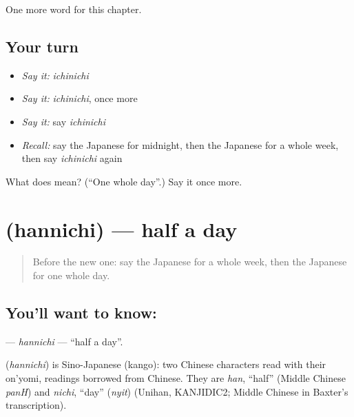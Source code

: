 \begin{grammarlens}[title={What you've built}]
One more word for this chapter.
\end{grammarlens}

\subsection*{Your turn}
\begin{itemize}
\raggedright
  \item \emph{Say it:} \emph{ichinichi}
  \item \emph{Say it:} \emph{ichinichi}, once more
  \item \emph{Say it:} say \emph{ichinichi}
  \item \emph{Recall:} say the Japanese for midnight, then the Japanese for a whole week, then say \emph{ichinichi} again
\end{itemize}

\begin{tcolorbox}[breakable,colback=teal!4,colframe=teal!35!black,title={Before you move on}]
What does  mean? (\textquotedblleft{}One whole day\textquotedblright{}.) Say it once more.
\end{tcolorbox}
\section[\texorpdfstring{\ja{はんにち} (hannichi)}{はんにち (hannichi)}]{ (hannichi) — half a day}

\label{lesson:JA-C76-hannichi}



\begin{quote}
Before the new one: say the Japanese for a whole week, then the Japanese for one whole day.
\end{quote}

\subsection*{You'll want to know: }
\textbf{} — \emph{hannichi} — \textquotedblleft{}half a day\textquotedblright{}.

\begin{cousinweb}
\textbf{} (\emph{hannichi}) is Sino-Japanese (kango): two Chinese characters read with their on'yomi, readings borrowed from Chinese. They are \emph{han}, \textquotedblleft{}half\textquotedblright{} (Middle Chinese \emph{panH}) and \emph{nichi}, \textquotedblleft{}day\textquotedblright{} (\emph{nyit}) (Unihan, KANJIDIC2; Middle Chinese in Baxter's transcription).
\end{cousinweb}


